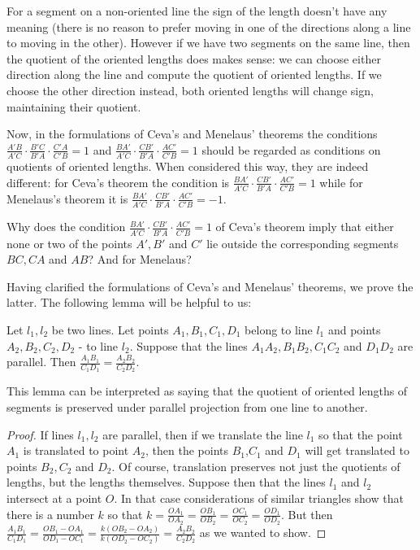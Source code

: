For a segment on a non-oriented line the sign of the length doesn't have any meaning (there is no reason to prefer moving in one of the directions along a line to moving in the other). However if we have two segments on the same line, then the quotient of the oriented lengths does makes sense: we can choose either direction along the line and compute the quotient of oriented lengths. If we choose the other direction instead, both oriented lengths will change sign, maintaining their quotient.

Now, in the formulations of Ceva's and Menelaus' theorems the conditions $\frac{A'B}{A'C}\cdot \frac{B'C}{B'A}\cdot\frac{C'A}{C'B}=1$ and $\frac{BA'}{A'C}\cdot\frac{CB'}{B'A}\cdot\frac{AC'}{C'B}=1$ should be regarded as conditions on quotients of oriented lengths. When considered this way, they are indeed different: for Ceva's theorem the condition is $\frac{BA'}{A'C}\cdot\frac{CB'}{B'A}\cdot\frac{AC'}{C'B}=1$ while for Menelaus's theorem it is $\frac{BA'}{A'C}\cdot\frac{CB'}{B'A}\cdot\frac{AC'}{C'B}=-1$.
\begin{question}
Why does the condition $\frac{BA'}{A'C}\cdot\frac{CB'}{B'A}\cdot\frac{AC'}{C'B}=1$ of Ceva's theorem imply that either none or two of the points $A',B'$ and $C'$ lie outside the corresponding segments $BC,CA$ and $AB$? And for Menelaus?
\end{question}
Having clarified the formulations of Ceva's and Menelaus' theorems, we prove the latter. The following lemma will be helpful to us:
\begin{lemma}
Let $l_1,l_2$ be two lines. Let points $A_1, B_1, C_1, D_1$ belong to line $l_1$ and points $A_2,B_2,C_2,D_2$ - to line $l_2$. Suppose that the lines $A_1A_2,B_1B_2,C_1C_2$ and $D_1D_2$ are parallel. Then $\frac{A_1B_1}{C_1D_1}=\frac{A_2B_2}{C_2D_2}$.
\end{lemma}
This lemma can be interpreted as saying that the quotient of oriented lengths of segments is preserved under parallel projection from one line to another.
\begin{proof}
If lines $l_1,l_2$ are parallel, then if we translate the line $l_1$ so that the point $A_1$ is translated to point $A_2$, then the points $B_1$,$C_1$ and $D_1$ will get translated to points $B_2,C_2$ and $D_2$. Of course, translation preserves not just the quotients of lengths, but the lengths themselves.
Suppose then that the lines $l_1$ and $l_2$ intersect at a point $O$. In that case considerations of similar triangles show that there is a number $k$ so that $k=\frac{OA_1}{OA_2}=\frac{OB_1}{OB_2}=\frac{OC_1}{OC_2}=\frac{OD_1}{OD_2}$. But then $\frac{A_1B_1}{C_1D_1}=\frac{OB_1-OA_1}{OD_1-OC_1}=\frac{k(OB_2-OA_2)}{k(OD_2-OC_2)}=\frac{A_2B_2}{C_2D_2}$ as we wanted to show.
\end{proof}
